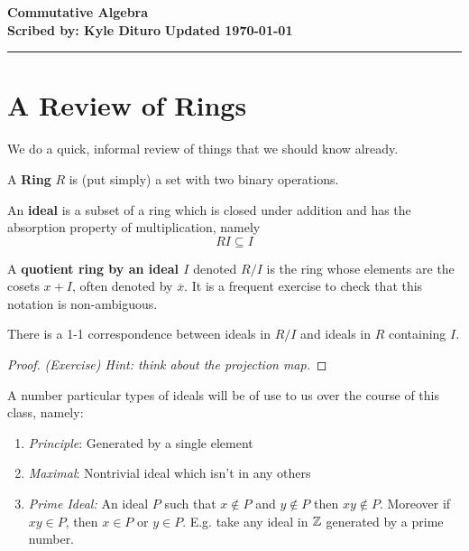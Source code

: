 \documentclass[12pt, twosided]{article}
\begin{document}
\noindent \textbf{Commutative Algebra} \hfill \textbf{} \\
\textbf{Scribed by: Kyle Dituro} \hfill \textbf{Updated \today}\hrule
\vspace{.2in}

\section{A Review of Rings}
We do a quick, informal review of things that we should know already.

\begin{df}
  A \textbf{Ring} \(R\) is (put simply) a set with two binary operations.
\end{df}

\begin{df}
  An \textbf{ideal} is a subset of a ring which is closed under addition and has the absorption property of multiplication, namely \[RI \subseteq I\]
\end{df}

\begin{df}
  A \textbf{quotient ring by an ideal \(I\)} denoted \(R/I\) is the ring whose elements are the cosets \(x + I\), often denoted by \(\overline{x}\). It is a frequent exercise to check that this notation is non-ambiguous.
\end{df}

\begin{prop}\label{Ex1}
  There is a 1-1 correspondence between ideals in \(R/I\) and ideals in \(R\) containing \(I\).
\end{prop}
\begin{proof}
  {\color{red} \textit{(Exercise) Hint: think about the projection map.}}
\end{proof}

A number particular types of ideals will be of use to us over the course of this class, namely:

\begin{enumerate}
\item \emph{Principle}: Generated by a single element
\item \emph{Maximal}: Nontrivial ideal which isn't in any others
\item \emph{Prime Ideal:} An ideal \(P\) such that \(x \not\in P\) and \(y \not\in P\) then \(xy \not\in P\). Moreover if \(xy \in P\), then \(x\in P\) or \(y \in P\). E.g. take any ideal in \(\mathbb{Z}\) generated by a prime number.
\end{enumerate}
\end{document}
